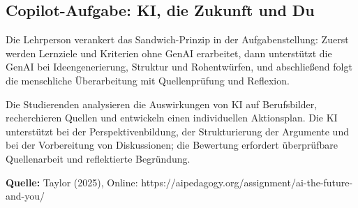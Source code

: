\documentclass[
  ngerman,
  letterpaper,
  DIV=11]{scrreprt}
\begin{document}
\subsection{Copilot-Aufgabe: KI, die Zukunft und
Du}\label{sec-prompt-ai-zukunft}

Die Lehrperson verankert das Sandwich-Prinzip in der Aufgabenstellung:
Zuerst werden Lernziele und Kriterien ohne GenAI erarbeitet, dann
unterstützt die GenAI bei Ideengenerierung, Struktur und Rohentwürfen,
und abschließend folgt die menschliche Überarbeitung mit Quellenprüfung
und Reflexion.

Die Studierenden analysieren die Auswirkungen von KI auf Berufsbilder,
recherchieren Quellen und entwickeln einen individuellen Aktionsplan.
Die KI unterstützt bei der Perspektivenbildung, der Strukturierung der
Argumente und bei der Vorbereitung von Diskussionen; die Bewertung
erfordert überprüfbare Quellenarbeit und reflektierte Begründung.

\textbf{Quelle:} Taylor (2025), Online:
https://aipedagogy.org/assignment/ai-the-future-and-you/
\end{document}

